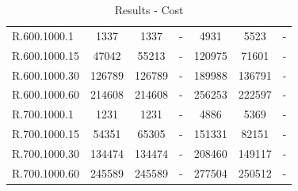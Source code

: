\documentclass[]{article}
\begin{document}
\begin{table}[htb]
\begin{tabular}{lcccccc}
			R.600.1000.1   & 1337   &    1337    & -      &   4931   &   5523   &   -     \\
			R.600.1000.15  & 47042  &    55213   & -      &   120975 &   71601  &   -     \\
			R.600.1000.30  & 126789 &    126789  & -      &   189988 &   136791 &   -     \\
			R.600.1000.60  & 214608 &    214608  & -      &   256253 &   222597 &   -     \\
			R.700.1000.1   & 1231   &    1231    & -      &   4886   &   5369   &   -     \\
			R.700.1000.15  & 54351  &    65305   & -      &   151331 &   82151  &   -     \\
			R.700.1000.30  & 134474 &    134474  & -      &   208460 &   149117 &   -     \\
			R.700.1000.60  & 245589 &    245589  & -      &   277504 &   250512 &   -     \\
		\end{tabular}
		\caption{Results - Cost}
		\label{table:results_cost}
	\end{table}

\end{document}
